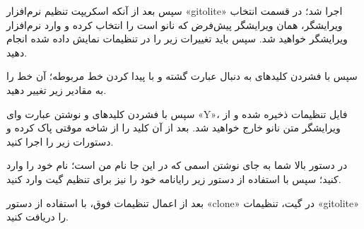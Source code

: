 سپس بعد از آنکه اسکریپت تنظیم نرم‌افزار «gitolite» اجرا شد؛ در قسمت انتخاب ویرایشگر، همان ویرایشگر پیش‌فرض که نانو است را انتخاب کرده و وارد نرم‌افزار ویرایشگر خواهید شد.  سپس باید تغییرات زیر را در تنظیمات نمایش داده شده انجام دهید.
\newline

\begin{latin}  
    
\end{latin}

سپس با فشردن کلیدهای 
به دنبال عبارت 
 گشته و با پیدا کردن خط مربوطه؛ آن خط را به مقادیر زیر تغییر دهید.
\newline

\begin{latin}  
    
\end{latin}

سپس با فشردن کلید‌های 
 و نوشتن عبارت وای «Y»، فایل تنظیمات ذخیره شده و از ویرایشگر متن نانو خارج خواهید شد. بعد از آن کلید را از شاخه موقتی پاک کرده و  دستورات زیر را اجرا کنید.
\newline

\begin{latin}  
    
\end{latin}

در دستور بالا شما به جای نوشتن اسمی که در این جا نام من است؛ نام خود را وارد کنید؛ سپس با استفاده از دستور زیر رایانامه خود را نیز برای تنظیم گیت وارد کنید.
\newline

\begin{latin}  
    
\end{latin}


بعد از اعمال تنظیمات فوق، با استفاده از دستور «clone» در گیت، تنظیمات «gitolite» را دریافت کنید.
\newline

\begin{latin}  
    
\end{latin}

